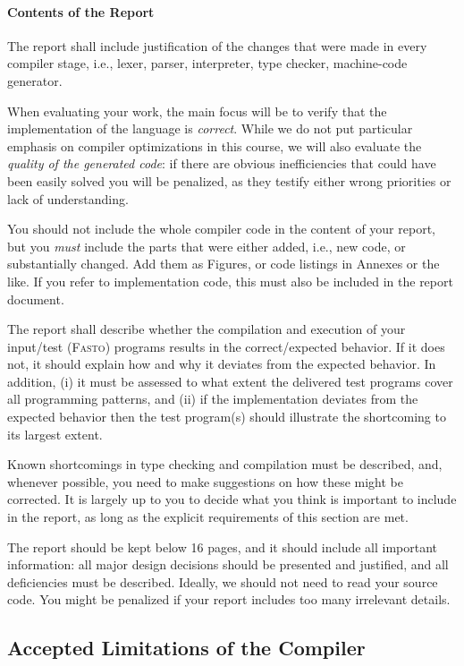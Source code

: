 \documentclass[a4paper,11pt]{article}
\newcommand{\fasto}{\textsc{Fasto}\xspace}
\begin{document}
\paragraph{Contents of the Report}
The report shall include justification of the changes that
were made in every compiler stage, i.e., lexer, parser, interpreter,
type checker, machine-code generator.

When evaluating your work, the main focus will be to verify that the
implementation of the language is {\em correct}.  While we do not
put particular emphasis on compiler optimizations in this course, 
we will also evaluate the {\em quality of the generated code}: 
if there are obvious inefficiencies that could have been easily 
solved you will be penalized, as they testify either wrong priorities 
or lack of understanding.

You should not include the whole compiler code in the content
of your report, but you {\em must} include the parts that were either
added, i.e., new code, or substantially changed.  Add them as
Figures, or code listings in Annexes or the like.   
%
If you refer to implementation code, this must also be included
in the report document.

The report shall describe whether the compilation and execution of
your input/test (\fasto) programs results
in the correct/expected behavior. If it does not, it should explain how 
and why it deviates from the expected behavior. In addition, (i) it must 
be assessed to what extent the delivered test programs cover all
programming patterns, and (ii) if the implementation deviates from the 
expected behavior then the test program(s) should illustrate the %
shortcoming to its largest extent. 

Known shortcomings in type checking and compilation must be described, 
and, whenever possible, you need to make suggestions on how these might
be corrected.
%
It is largely up to you to decide what you think is important to include 
in the report, as long as the explicit requirements of this section are met.

The report should be kept below 16 pages, and it should include all 
important information: all major design decisions should be presented 
and justified, and all deficiencies must be described.   Ideally, we
should not need to read your source code.
You might be penalized if your report includes too many irrelevant details. 

\subsection{Accepted Limitations of the Compiler}
\end{document}
